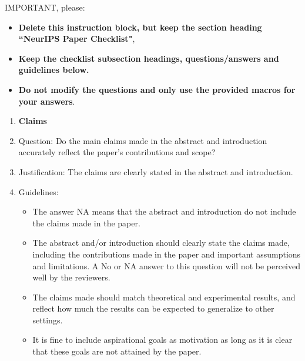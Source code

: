 \documentclass{article}
\begin{document}
IMPORTANT, please:
\begin{itemize}
    \item {\bf Delete this instruction block, but keep the section heading ``NeurIPS Paper Checklist"},
    \item  {\bf Keep the checklist subsection headings, questions/answers and guidelines below.}
    \item {\bf Do not modify the questions and only use the provided macros for your answers}.
\end{itemize} 
 



\begin{enumerate}

\item {\bf Claims}
    \item[] Question: Do the main claims made in the abstract and introduction accurately reflect the paper's contributions and scope?
    \answerYes{}
    \item[] Justification: The claims are clearly stated in the abstract and introduction.
    \item[] Guidelines:
    \begin{itemize}
        \item The answer NA means that the abstract and introduction do not include the claims made in the paper.
        \item The abstract and/or introduction should clearly state the claims made, including the contributions made in the paper and important assumptions and limitations. A No or NA answer to this question will not be perceived well by the reviewers. 
        \item The claims made should match theoretical and experimental results, and reflect how much the results can be expected to generalize to other settings. 
        \item It is fine to include aspirational goals as motivation as long as it is clear that these goals are not attained by the paper. 
    \end{itemize}


\end{enumerate}
\end{document}
